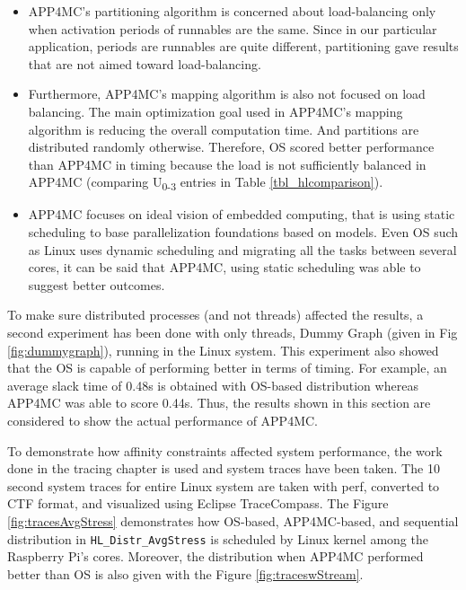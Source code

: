 \begin{itemize}
\begin{itemize}
		\item APP4MC's partitioning algorithm is concerned about load-balancing only when activation periods of runnables are the same. Since in our particular application, periods are runnables are quite different, partitioning gave results that are not aimed toward load-balancing.
		\item Furthermore, APP4MC's mapping algorithm is also not focused on load balancing. The main optimization goal used in APP4MC's mapping algorithm is reducing the overall computation time. And partitions are distributed randomly otherwise. Therefore, OS scored better performance than APP4MC in timing because the load is not sufficiently balanced in APP4MC (comparing U\textsubscript{0-3} entries in Table \ref{tbl_hlcomparison}).
		\item APP4MC focuses on ideal vision of embedded computing, that is using static scheduling to base parallelization foundations based on models. Even OS such as Linux uses dynamic scheduling and migrating all the tasks between several cores, it can be said that APP4MC, using static scheduling was able to suggest better outcomes.
	\end{itemize}
\end{itemize}

To make sure distributed processes (and not threads) affected the results, a second experiment has been done with only threads, Dummy Graph (given in Fig \ref{fig:dummygraph}), running in the Linux system. This experiment also showed that the OS is capable of performing better in terms of timing. For example, an average slack time of 0.48s is obtained with OS-based distribution whereas APP4MC was able to score 0.44s. Thus, the results shown in this section are considered to show the actual performance of APP4MC.

To demonstrate how affinity constraints affected system performance, the work done in the tracing chapter is used and system traces have been taken. The 10 second system traces for entire Linux system are taken with perf, converted to CTF format, and visualized using Eclipse TraceCompass. The Figure \ref{fig:tracesAvgStress} demonstrates how OS-based, APP4MC-based, and sequential distribution in \texttt{HL{\_}Distr{\_}AvgStress} is scheduled by Linux kernel among the Raspberry Pi's cores. Moreover, the distribution when APP4MC performed better than OS is also given with the Figure \ref{fig:traceswStream}.

